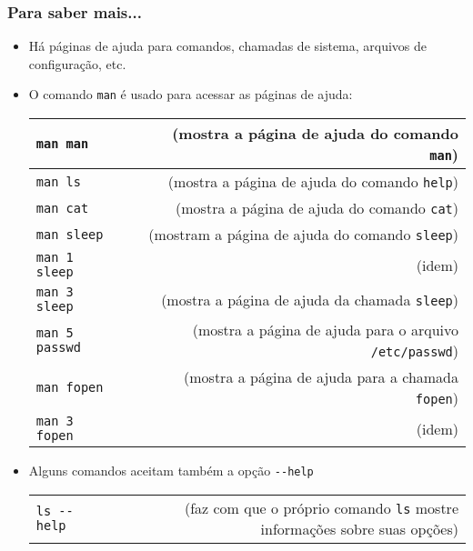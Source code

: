 \documentclass[aspectratio=169]{beamer}
\begin{document}
\begin{frame}\frametitle{Para saber mais...}
\begin{itemize}
	\item Há páginas de ajuda para comandos, chamadas de sistema, arquivos de configuração, etc.
	\item O comando \texttt{man} é usado para acessar as páginas de ajuda:\\
\begin{tabular}{lp{5cm}r}
\texttt{man man} & & \tiny{(mostra a página de ajuda do comando \texttt{man})}\\\hline
\texttt{man ls} & & \tiny{(mostra a página de ajuda do comando \texttt{help})}\\\hline
\texttt{man cat} & & \tiny{(mostra a página de ajuda do comando \texttt{cat})}\\\hline
\texttt{man sleep} & & \tiny{(mostram a página de ajuda do comando \texttt{sleep})}\\\hline
\texttt{man 1 sleep} & & \tiny{(idem)}\\\hline
\texttt{man 3 sleep} & & \tiny{(mostra a página de ajuda da chamada \texttt{sleep})}\\\hline
\texttt{man 5 passwd} & & \tiny{(mostra a página de ajuda para o arquivo \texttt{/etc/passwd})}\\\hline
\texttt{man fopen} & & \tiny{(mostra a página de ajuda para a chamada \texttt{fopen})}\\\hline
\texttt{man 3 fopen} & & \tiny{	(idem)}\\
\end{tabular}
	\item Alguns comandos aceitam também a opção \texttt{-{}-help}\\
\begin{tabular}{lp{3.4cm}r}
\texttt{ls -{}-help} & & \tiny{(faz com que o próprio comando \texttt{ls} mostre informações sobre suas opções)}\\
\end{tabular}
\end{itemize}
\end{frame}
\end{document}
